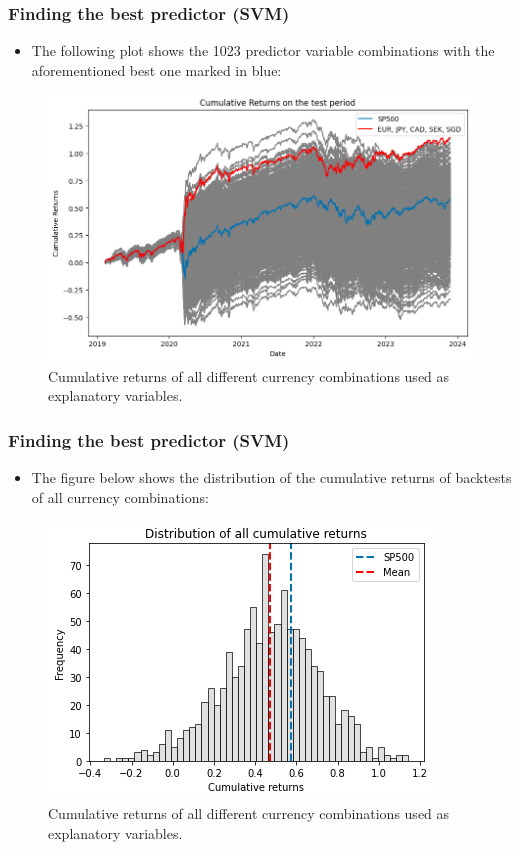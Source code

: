\documentclass{beamer}
\begin{document}
\begin{frame}
\frametitle{Finding the best predictor (SVM)}
\begin{itemize}
    \item The following plot shows the 1023 predictor variable combinations with the aforementioned best one marked in blue:
\end{itemize}
\begin{figure}[h!]
\begin{center}
  \includegraphics[width=0.6\columnwidth]{images/best_predictor.png}
  \caption{Cumulative returns of all different currency combinations used as explanatory variables.}
\end{center}
  \label{fig: cumulative returns}
\end{figure}
\end{frame}

\begin{frame}
\frametitle{Finding the best predictor (SVM)}
\begin{itemize}
    \item The figure below shows the distribution of the cumulative returns of backtests of all currency combinations:
\end{itemize}
\begin{figure}[h!]
\begin{center}
  \includegraphics[width=0.55\columnwidth]{images/hist_comparison.png}
  \caption{Cumulative returns of all different currency combinations used as explanatory variables.}
\end{center}
  \label{fig: cumulative returns}
\end{figure}

\end{frame}
\end{document}
